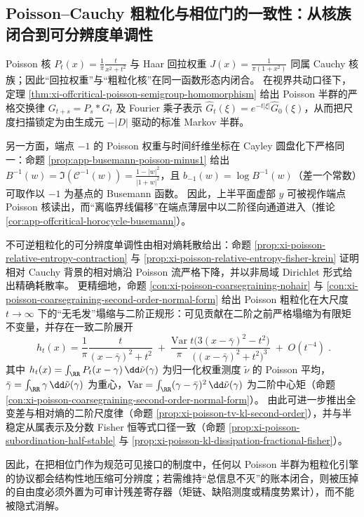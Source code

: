 \subsection{Poisson--Cauchy 粗粒化与相位门的一致性：从核族闭合到可分辨度单调性}\label{subsec:cdim-poisson-cauchy}
Poisson 核
\(
P_t(x)=\frac{1}{\pi}\frac{t}{x^2+t^2}
\)
与 Haar 回拉权重 \(J(x)=\frac{1}{\pi(1+x^2)}\) 同属 Cauchy 核族；因此“回拉权重”与“粗粒化核”在同一函数形态内闭合。
在视界共动口径下，定理 \ref{thm:xi-offcritical-poisson-semigroup-homomorphism} 给出 Poisson 半群的严格交换律 \(G_{t+s}=P_s*G_t\) 及 Fourier 乘子表示 \(\widehat G_t(\xi)=e^{-t|\xi|}\widehat G_0(\xi)\)，从而把尺度扫描锁定为由生成元 \(-|D|\) 驱动的标准 Markov 半群。
\par
另一方面，端点 \(-1\) 的 Poisson 权重与时间纤维坐标在 Cayley 圆盘化下严格同一：命题 \ref{prop:app-busemann-poisson-minus1} 给出
\(
B^{-1}(w)=\Im(\mathcal{C}^{-1}(w))=\frac{1-|w|^{2}}{|1+w|^{2}}
\)，且 \(b_{-1}(w)=\log B^{-1}(w)\)（差一个常数）可取作以 \(-1\) 为基点的 Busemann 函数。
因此，上半平面虚部 \(y\) 可被视作端点 Poisson 核读出，而“离临界线偏移”在端点薄层中以二阶径向通道进入（推论 \ref{cor:app-offcritical-horocycle-busemann}）。
\par
不可逆粗粒化的可分辨度单调性由相对熵耗散给出：命题 \ref{prop:xi-poisson-relative-entropy-contraction} 与 \ref{prop:xi-poisson-relative-entropy-fisher-krein} 证明相对 Cauchy 背景的相对熵沿 Poisson 流严格下降，并以非局域 Dirichlet 形式给出精确耗散率。
更精细地，命题 \ref{con:xi-poisson-coarsegraining-nohair} 与 \ref{con:xi-poisson-coarsegraining-second-order-normal-form} 给出 Poisson 粗粒化在大尺度 \(t\to\infty\) 下的“无毛发”塌缩与二阶正规形：可见贡献在二阶之前严格塌缩为有限矩不变量，并存在一致二阶展开
\[
\boxed{\;
h_t(x)
=
\frac{1}{\pi}\frac{t}{(x-\bar\gamma)^2+t^2}
\;+\;
\frac{\mathrm{Var}}{\pi}\,
\frac{t\bigl(3(x-\bar\gamma)^2-t^2\bigr)}{\bigl((x-\bar\gamma)^2+t^2\bigr)^3}
\;+\;O(t^{-4})\; }.
\]
其中 \(h_t(x)=\int_{\RR}P_t(x-\gamma)\,\dd\tilde\nu(\gamma)\) 为归一化权重测度 \(\tilde\nu\) 的 Poisson 平均，\(\bar\gamma=\int_{\RR}\gamma\,\dd\tilde\nu(\gamma)\) 为重心，\(\mathrm{Var}=\int_{\RR}(\gamma-\bar\gamma)^2\,\dd\tilde\nu(\gamma)\) 为二阶中心矩（命题 \ref{con:xi-poisson-coarsegraining-second-order-normal-form}）。
由此可进一步推出全变差与相对熵的二阶尺度律（命题 \ref{prop:xi-poisson-tv-kl-second-order}），并与半稳定从属表示及分数 Fisher 恒等式口径一致（命题 \ref{prop:xi-poisson-subordination-half-stable} 与 \ref{prop:xi-poisson-kl-dissipation-fractional-fisher}）。
\par
因此，在把相位门作为规范可见接口的制度中，任何以 Poisson 半群为粗粒化引擎的协议都会结构性地压缩可分辨度；若需维持“总信息不灭”的账本闭合，则被压掉的自由度必须外置为可审计残差寄存器（矩链、缺陷测度或精度势累计），而不能被隐式消解。

